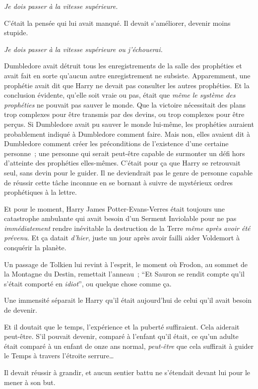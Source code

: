 \emph{Je dois passer à la vitesse supérieure.}

C'était la pensée qui lui avait manqué. Il devait s'améliorer, devenir moins stupide.

\emph{Je dois passer à la vitesse supérieure ou j'échouerai.}

Dumbledore avait détruit tous les enregistrements de la salle des prophéties et avait fait en sorte qu'aucun autre enregistrement ne subsiste. Apparemment, une prophétie avait dit que Harry ne devait pas consulter les autres prophéties. Et la conclusion évidente, qu'elle soit vraie ou pas, était que \emph{même le système des prophéties} ne pouvait pas sauver le monde. Que la victoire nécessitait des plans trop complexes pour être transmis par des devins, ou trop complexes pour être perçus. Si Dumbledore avait pu sauver le monde lui-même, les prophéties auraient probablement indiqué à Dumbledore comment faire. Mais non, elles avaient dit à Dumbledore comment créer les préconditions de l'existence d'une certaine personne~; une personne qui serait peut-être capable de surmonter un défi hors d'atteinte des prophéties elles-mêmes. C'était pour ça que Harry se retrouvait seul, sans devin pour le guider. Il ne deviendrait pas le genre de personne capable de réussir cette tâche inconnue en se bornant à suivre de mystérieux ordres prophétiques à la lettre.

Et pour le moment, Harry James Potter-Evans-Verres était toujours une catastrophe ambulante qui avait besoin d'un Serment Inviolable pour ne pas \emph{immédiatement} rendre inévitable la destruction de la Terre \emph{même après avoir été prévenu}. Et ça datait \emph{d'hier}, juste un jour après avoir failli aider Voldemort à conquérir la planète.

Un passage de Tolkien lui revint à l'esprit, le moment où Frodon, au sommet de la Montagne du Destin, remettait l'anneau~; “Et Sauron se rendit compte qu'il s'était comporté en \emph{idiot}”, ou quelque chose comme ça.

Une immensité séparait le Harry qu'il était aujourd'hui de celui qu'il avait besoin de devenir.

Et il doutait que le temps, l'expérience et la puberté suffiraient. Cela aiderait peut-être. S'il pouvait devenir, comparé à l'enfant qu'il était, ce qu'un adulte était comparé à un enfant de onze ans normal, \emph{peut-être} que cela suffirait à guider le Temps à travers l'étroite serrure…

Il devait réussir à grandir, et aucun sentier battu ne s'étendait devant lui pour le mener à son but.

